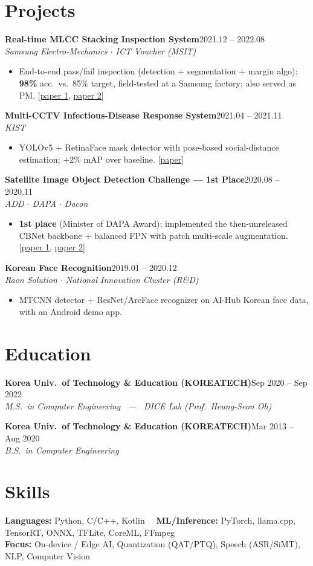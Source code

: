 \documentclass[a4paper,10pt]{article}
\newcommand{\entry}[3]{\textbf{#1}\hfill{\color{muted}#2}\\ \textit{#3}\par\vspace{1pt}}
\begin{document}
\section{Projects}
\entry{Real-time MLCC Stacking Inspection System}{2021.12 -- 2022.08}{Samsung Electro-Mechanics $\cdot$ ICT Voucher (MSIT)}
\begin{itemize}
  \item End-to-end pass/fail inspection (detection + segmentation + margin algo): \textbf{98\%} acc.\ vs.\ 85\% target,
  field-tested at a Samsung factory; also served as PM. {\small[\href{https://www.kci.go.kr/kciportal/ci/sereArticleSearch/ciSereArtiView.kci?sereArticleSearchBean.artiId=ART002856842}{paper 1}, \href{https://www.kci.go.kr/kciportal/ci/sereArticleSearch/ciSereArtiView.kci?sereArticleSearchBean.artiId=ART002884720}{paper 2}]}
\end{itemize}
\entry{Multi-CCTV Infectious-Disease Response System}{2021.04 -- 2021.11}{KIST}
\begin{itemize}
  \item YOLOv5 + RetinaFace mask detector with pose-based social-distance estimation; $+$2\% mAP over baseline.
  {\small[\href{https://www.kci.go.kr/kciportal/ci/sereArticleSearch/ciSereArtiView.kci?sereArticleSearchBean.artiId=ART002864253}{paper}]}
\end{itemize}
\entry{Satellite Image Object Detection Challenge --- 1st Place}{2020.08 -- 2020.11}{ADD $\cdot$ DAPA $\cdot$ Dacon}
\begin{itemize}
  \item \textbf{1st place} (Minister of DAPA Award); implemented the then-unreleased CBNet backbone + balanced FPN
  with patch multi-scale augmentation. {\small[\href{https://www.kci.go.kr/kciportal/ci/sereArticleSearch/ciSereArtiView.kci?sereArticleSearchBean.artiId=ART002782712}{paper 1}, \href{https://www.kci.go.kr/kciportal/ci/sereArticleSearch/ciSereArtiView.kci?sereArticleSearchBean.artiId=ART002643994}{paper 2}]}
\end{itemize}
\entry{Korean Face Recognition}{2019.01 -- 2020.12}{Raon Solution $\cdot$ National Innovation Cluster (R\&D)}
\begin{itemize}
  \item MTCNN detector + ResNet/ArcFace recognizer on AI-Hub Korean face data, with an Android demo app.
\end{itemize}

\section{Education}
\entry{Korea Univ.\ of Technology \& Education (KOREATECH)}{Sep 2020 -- Sep 2022}{M.S.\ in Computer Engineering ~---~ DICE Lab (Prof.\ Heung-Seon Oh)}
\vspace{2pt}
\entry{Korea Univ.\ of Technology \& Education (KOREATECH)}{Mar 2013 -- Aug 2020}{B.S.\ in Computer Engineering}

\section{Skills}
\textbf{Languages:} Python, C/C++, Kotlin ~~\textbf{ML/Inference:} PyTorch, llama.cpp, TensorRT, ONNX, TFLite, CoreML, FFmpeg\\
\textbf{Focus:} On-device / Edge AI, Quantization (QAT/PTQ), Speech (ASR/SiMT), NLP, Computer Vision
\end{document}

